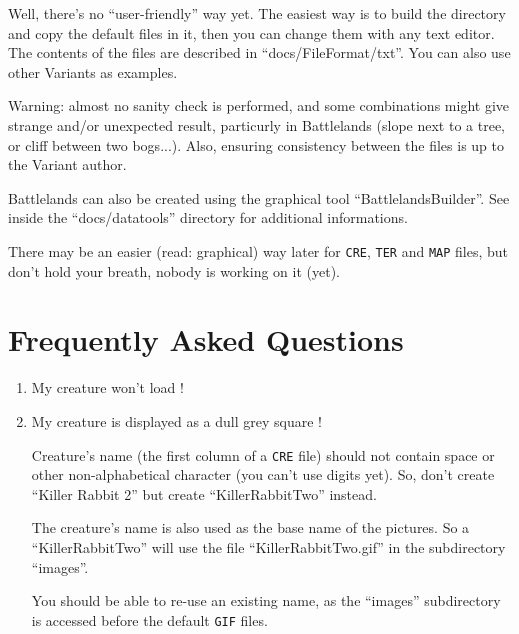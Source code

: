 \documentclass{article}
\begin{document}
Well, there's no ``user-friendly'' way yet. The easiest way is
to build the directory and copy the default files in it,
then you can change them with any text editor. The contents
of the files are described in ``docs/FileFormat/txt''. You can
also use other Variants as examples.

Warning: almost no sanity check is performed, and some
combinations might give strange and/or unexpected result,
particurly in Battlelands (slope next to a tree, or
cliff between two bogs...). Also, ensuring consistency
between the files is up to the Variant author.

Battlelands can also be created using the graphical
tool ``BattlelandsBuilder''. See inside the ``docs/datatools''
directory for additional informations.

There may be an easier (read: graphical) way later for
\texttt{CRE}, \texttt{TER} and \texttt{MAP} files, but don't hold your breath, nobody
is working on it (yet).

\section{Frequently Asked Questions}

\begin{enumerate}

\item My creature won't load !
\item My creature is displayed as a dull grey square !

Creature's name (the first column of a \texttt{CRE} file) should not
contain space or other non-alphabetical character (you
can't use digits yet). So, don't create ``Killer Rabbit 2''
but create ``KillerRabbitTwo'' instead.

The creature's name is also used as the base name
of the pictures. So a ``KillerRabbitTwo'' will use
the file ``KillerRabbitTwo.gif'' in the subdirectory
``images''.

You should be able to re-use an existing name, as
the ``images'' subdirectory is accessed before the default
\texttt{GIF} files.

\end{enumerate}
\end{document}

